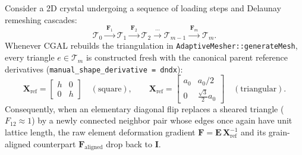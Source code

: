 \documentclass[11pt,a4paper]{article}
\newcommand{\code}[1]{\texttt{#1}}
\begin{document}
Consider a 2D crystal undergoing a sequence of loading steps and Delaunay remeshing cascades:
\begin{equation}
  \mathcal{T}_0 \xrightarrow{\;\mathbf{F}_1\;} \mathcal{T}_1 \xrightarrow{\;\mathbf{F}_2\;} \mathcal{T}_2 \xrightarrow{\;\cdots\;} \mathcal{T}_{m-1} \xrightarrow{\;\mathbf{F}_m\;} \mathcal{T}_m.
\end{equation}
Whenever CGAL rebuilds the triangulation in \code{AdaptiveMesher::generateMesh}, every triangle $e \in \mathcal{T}_m$ is constructed fresh with the canonical parent reference derivatives (\code{manual\_shape\_derivative = dndx}):
\begin{equation}
  \mathbf{X}_{\text{ref}} =
  \begin{bmatrix} h & 0 \\ 0 & h \end{bmatrix} \quad (\text{square}), \qquad
  \mathbf{X}_{\text{ref}} =
  \begin{bmatrix} a_0 & a_0/2 \\ 0 & \frac{\sqrt{3}}{2}a_0 \end{bmatrix} \quad (\text{triangular}).
\end{equation}
Consequently, when an elementary diagonal flip replaces a sheared triangle ($F_{12} \approx 1$) by a newly connected neighbor pair whose edges once again have unit lattice length, the raw element deformation gradient $\mathbf{F} = \mathbf{E}\,\mathbf{X}_{\text{ref}}^{-1}$ and its grain-aligned counterpart $\mathbf{F}_{\text{aligned}}$ drop back to $\mathbf{I}$.
\end{document}
